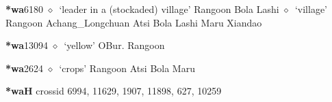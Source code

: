   \begin{list}{}{\leftmargin=1.5em \itemindent=-1.5em}
  \item {\footnotesize \textbf{*wa}}{\tiny 6180}
         $\diamond$~`leader in a (stockaded) village'
         Rangoon 
\hspace{1ex}
         Bola 
\hspace{1ex}
         Lashi 
\hspace{1ex}
         $\diamond$~`village'
         Rangoon 
\hspace{1ex}
         Achang\_Longchuan 
\hspace{1ex}
         Atsi 
\hspace{1ex}
         Bola 
\hspace{1ex}
         Lashi 
\hspace{1ex}
         Maru 
\hspace{1ex}
         Xiandao 
  \item {\footnotesize \textbf{*wa}}{\tiny 13094}
\hspace{1ex}
         $\diamond$~`yellow'
         OBur. 
\hspace{1ex}
         Rangoon 
  \item {\footnotesize \textbf{*wa}}{\tiny 2624}
\hspace{1ex}
         $\diamond$~`crops'
         Rangoon 
\hspace{1ex}
         Atsi 
\hspace{1ex}
         Bola 
\hspace{1ex}
         Maru 
  \end{list}
\item
\textbf{*waH}
  {\tiny crossid 6994, 11629, 1907, 11898, 627, 10259}
